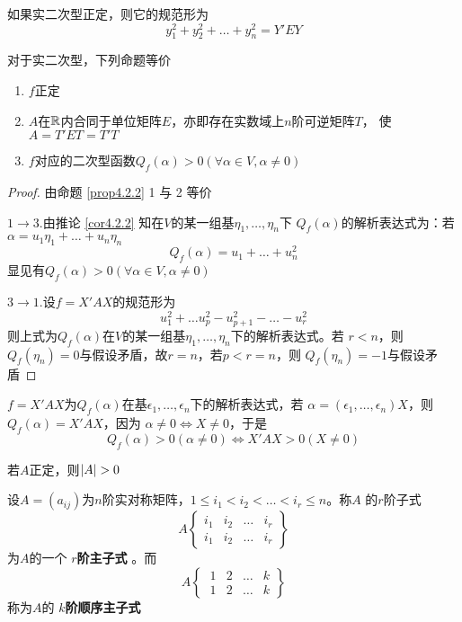 \documentclass[11pt]{article}
\begin{document}
如果实二次型正定，则它的规范形为
\begin{equation*}
y_1^2+y_2^2+\dots+y_n^2=Y'EY
\end{equation*}

\begin{theorem}[]
\label{prop4.4.1}
对于实二次型，下列命题等价
\begin{enumerate}
\item \(f\)正定
\item \(A\)在\(\mathbb{R}\)内合同于单位矩阵\(E\)，亦即存在实数域上\(n\)阶可逆矩阵\(T\)，
使\(A=T'ET=T'T\)
\item \(f\)对应的二次型函数\(Q_f(\alpha)>0(\forall\alpha\in V,\alpha\neq0)\)
\end{enumerate}
\end{theorem}

\begin{proof}
由命题 \ref{prop4.2.2} 1 与 2 等价

\(1\to3\).由推论 \ref{cor4.2.2} 知在\(V\)的某一组基\(\eta_1,\dots,\eta_n\)下
\(Q_f(\alpha)\)的解析表达式为：若\(\alpha=u_1\eta_1+\dots+u_n\eta_n\)
\begin{equation*}
Q_f(\alpha)=u_1+\dots+u_n^2
\end{equation*}
显见有\(Q_f(\alpha)>0(\forall\alpha\in V,\alpha\neq0)\)

\(3\to1\).设\(f=X'AX\)的规范形为
\begin{equation*}
u_1^2+\dots u_p^2-u_{p+1}^2-\dots-u_{r}^2
\end{equation*}
则上式为\(Q_f(\alpha)\)在\(V\)的某一组基\(\eta_1,\dots,\eta_n\)下的解析表达式。若
\(r<n\)，则\(Q_f(\eta_n)=0\)与假设矛盾，故\(r=n\)，若\(p<r=n\)，则
\(Q_f(\eta_n)=-1\)与假设矛盾
\end{proof}

\(f=X'AX\)为\(Q_f(\alpha)\)在基\(\epsilon_1,\dots,\epsilon_n\)下的解析表达式，若
\(\alpha=(\epsilon_1,\dots,\epsilon_n)X\)，则\(Q_f(\alpha)=X'AX\)，因为
\(\alpha\neq0\Leftrightarrow X\neq0\)，于是
\begin{equation*}
Q_f(\alpha)>0(\alpha\neq0)\Leftrightarrow X'AX>0(X\neq0)
\end{equation*}

\begin{corollary}[]
若\(A\)正定，则\(\abs{A}>0\)
\end{corollary}

设\(A=(a_{ij})\)为\(n\)阶实对称矩阵，\(1\le i_1<i_2<\dots<i_r\le n\)。称\(A\)
的\(r\)阶子式
\begin{equation*}
A\left\{
\begin{array}{cccc}
i_1&i_2&\dots&i_r\\
i_1&i_2&\dots&i_r
\end{array}
\right\}
\end{equation*}
为\(A\)的一个 \textbf{\(r\)阶主子式} 。而
\begin{equation*}
A\left\{\
\begin{array}{cccc}
1&2&\dots&k\\
1&2&\dots&k
\end{array}
\right\}
\end{equation*}
称为\(A\)的 \textbf{\(k\)阶顺序主子式}
\end{document}
